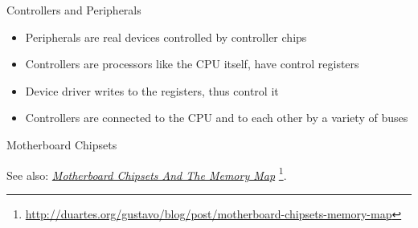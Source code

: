 \begin{frame}{Controllers and Peripherals}
  \begin{itemize}
  \item Peripherals are real devices controlled by controller chips
  \item Controllers are processors like the CPU itself, have control registers
  \item Device driver writes to the registers, thus control it
  \item Controllers are connected to the CPU and to each other by a variety of buses
  \end{itemize}
\end{frame}

\begin{frame}
  \begin{center}
  \end{center}
\end{frame}

\begin{frame}{Motherboard Chipsets}
  \begin{center}
  \end{center}
\end{frame}

See also:
\href{http://duartes.org/gustavo/blog/post/motherboard-chipsets-memory-map}{\emph{Motherboard
    Chipsets And The Memory Map}}
\footnote{\url{http://duartes.org/gustavo/blog/post/motherboard-chipsets-memory-map}}.

